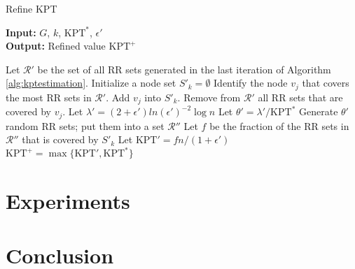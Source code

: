 \documentclass[a4paper,12pt]{article}
\begin{document}
\begin{algorithm}
\caption{Refine KPT}\label{alg:kptrefinement}
\hspace*{\algorithmicindent} \textbf{Input: } $G$, $k$, $\text{KPT}^*$, $\epsilon'$\\
\hspace*{\algorithmicindent} \textbf{Output: } Refined value $\text{KPT}^+$
\begin{algorithmic}[1]
\State Let $\mathcal{R}'$ be the set of all RR sets generated in the last iteration of Algorithm \ref{alg:kptestimation}.
\State Initialize a node set $S'_k = \emptyset$
\State Identify the node $v_j$ that covers the most RR sets in $\mathcal{R}'$.
\State Add $v_j$ into $S'_k$.
\State Remove from $\mathcal{R}'$ all RR sets that are covered by $v_j$.
\EndFor
\State Let $\lambda' = (2+\epsilon')ln (\epsilon')^{-2} \log n$
\State Let $\theta' = \lambda' / \text{KPT}^*$
\State Generate $\theta'$ random RR sets; put them into a set $\mathcal{R}''$
\State Let $f$ be the fraction of the RR sets in $\mathcal{R}''$ that is covered by $S'_k$
\State Let $\text{KPT}' = fn/(1+\epsilon')$
\State\Return $\text{KPT}^+ = \max\{\text{KPT}', \text{KPT}^*\}$
\end{algorithmic}
\end{algorithm}


\section{Experiments}
\label{scn:exp}

\section{Conclusion}



\end{document}
